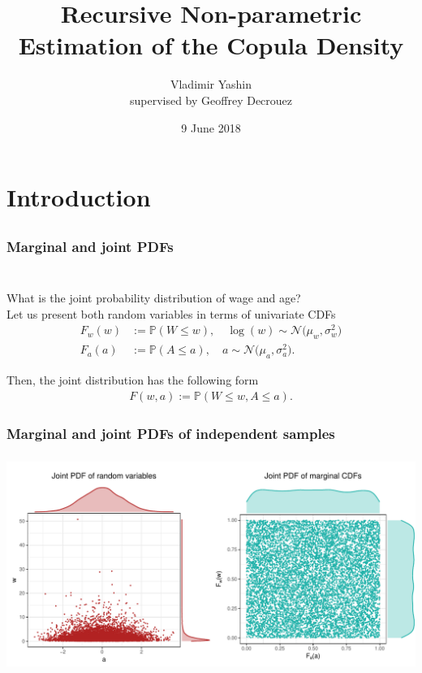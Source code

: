 \documentclass[aspectratio=169]{beamer}
\author{Vladimir Yashin\\ supervised by Geoffrey Decrouez}
\title{Recursive Non-parametric Estimation of the Copula Density}
\institute{Higher School of Economics}
\date{9 June 2018}
\begin{document}
	\maketitle
	
\section{Introduction}
	\subsection{}
		\subsubsection{Marginal and joint PDFs}
			\begin{frame}
				\frametitle{\insertsubsubsection}
				~\\[1em]
				\onslide<1-> What is the joint probability distribution of wage and age? \\[1em]
				
				\onslide<2-> Let us present both random variables in terms of univariate CDFs
				\begin{align}
					F_w(w) &:= \mathbb{P}(W\leq w), \quad \log(w)\sim\mathcal{N}\big(\mu_w, \sigma_w^2\big) \\
					F_a(a) &:= \mathbb{P}(A\leq a), \quad a\sim\mathcal{N}\big(\mu_a, \sigma_a^2\big).
				\end{align}
				
				 Then, the joint distribution has the following form
				\begin{align}
					F(w, a) := \mathbb{P}(W\leq w, A\leq a).
				\end{align}

			\end{frame}
		
		\subsubsection{Marginal and joint PDFs of independent samples}
			\begin{frame}
				\frametitle{\insertsubsubsection}				
				
				\onslide<1-> 
				\begin{center}
					\includegraphics[width=0.95\linewidth]{plots/introduction/indep}
				\end{center}
				
			\end{frame}
			
\end{document}
